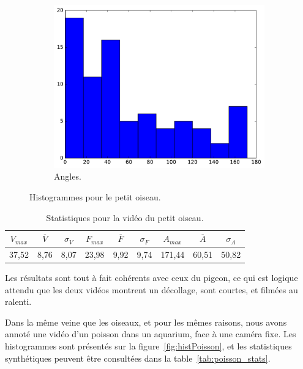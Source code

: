 \begin{figure}[!htbp]
\begin{subfigure}[t]{\subImgWclicks}
			\centering
			\includegraphics[width=\textwidth]{figures/ch3/bird_angle}
			\caption{Angles.}
			\label{fig:bird_angle}
		\end{subfigure}
		\caption[Histogrammes pour le petit oiseau]{Histogrammes pour le petit oiseau.}
		\label{fig:histBird}
	\end{figure}
	
\begin{table}
	\centering
	\begin{tabular}{c c c c c c c c c}
		$V_{max}$	& $\overline{V}$	& $\sigma_{V}$	& $F_{max}$	& $\overline{F}$	& $\sigma_{F}$	& $A_{max}$	& $\overline{A}$	& $\sigma_{A}$	\bigstrut[b] \\ \hline

		37,52		& 8,76				& 8,07			& 23,98		& 9,92				& 9,74			& 171,44	& 60,51				& 50,82			\bigstrut[t] \\
	\end{tabular}
	\caption[Statistiques pour la vidéo du petit oiseau]{Statistiques pour la vidéo du petit oiseau.}
	\label{tab:bird_stats}
\end{table}

	Les résultats sont tout à fait cohérents avec ceux du pigeon, ce qui est logique attendu que les deux vidéos montrent un décollage, sont courtes, et filmées au ralenti.

	Dans la même veine que les oiseaux, et pour les mêmes raisons, nous avons annoté une vidéo d'un poisson dans un aquarium, face à une caméra fixe. Les histogrammes sont présentés sur la figure~\ref{fig:histPoisson}, et les statistiques synthétiques peuvent être consultées dans la table~\ref{tab:poisson_stats}.
	
